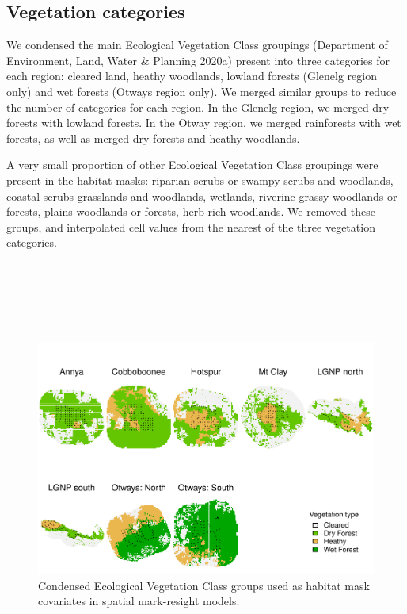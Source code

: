\documentclass[11pt,a4paper,titlepage,twoside,openright]{style/unimelbthesis}
\begin{document}
\begin{mainmatter}
\hypertarget{density-app-veg}{%
\section{Vegetation categories}\label{density-app-veg}}

We condensed the main Ecological Vegetation Class groupings (Department of Environment, Land, Water \& Planning 2020a) present into three categories for each region: cleared land, heathy woodlands, lowland forests (Glenelg region only) and wet forests (Otways region only). We merged similar groups to reduce the number of categories for each region. In the Glenelg region, we merged dry forests with lowland forests. In the Otway region, we merged rainforests with wet forests, as well as merged dry forests and heathy woodlands.

A very small proportion of other Ecological Vegetation Class groupings were present in the habitat masks: riparian scrubs or swampy scrubs and woodlands, coastal scrubs grasslands and woodlands, wetlands, riverine grassy woodlands or forests, plains woodlands or forests, herb-rich woodlands. We removed these groups, and interpolated cell values from the nearest of the three vegetation categories.

\newpage

\(~\)

\(~\)

\(~\)
\begin{figure}

{\centering \includegraphics[width=1\linewidth]{figure/density-veg-1} 

}

\caption{Condensed Ecological Vegetation Class groups used as habitat mask covariates in spatial mark-resight models.}\label{fig:density-veg}
\end{figure}
\newpage


\end{mainmatter}
\end{document}
